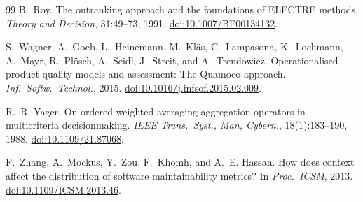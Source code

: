 \documentclass[11pt]{article}
\theoremstyle{remark}
\begin{document}
\begin{thebibliography}{99}
B.~Roy.
\newblock The outranking approach and the foundations of {ELECTRE} methods.
\newblock \emph{Theory and Decision}, 31:49--73, 1991.
\newblock \href{https://doi.org/10.1007/BF00134132}{doi:10.1007/BF00134132}.

S.~Wagner, A.~Goeb, L.~Heinemann, M.~Kl{\"a}s, C.~Lampasona, K.~Lochmann,
  A.~Mayr, R.~Pl{\"o}sch, A.~Seidl, J.~Streit, and A.~Trendowicz.
\newblock Operationalised product quality models and assessment: The
  {Quamoco} approach.
\newblock \emph{Inf.\ Softw.\ Technol.}, 2015.
\newblock \href{https://doi.org/10.1016/j.infsof.2015.02.009}{doi:10.1016/j.infsof.2015.02.009}.

R.~R. Yager.
\newblock On ordered weighted averaging aggregation operators in multicriteria
  decisionmaking.
\newblock \emph{IEEE Trans.\ Syst., Man, Cybern.}, 18(1):183--190, 1988.
\newblock \href{https://doi.org/10.1109/21.87068}{doi:10.1109/21.87068}.

F.~Zhang, A.~Mockus, Y.~Zou, F.~Khomh, and A.~E. Hassan.
\newblock How does context affect the distribution of software maintainability
  metrics?
\newblock In \emph{Proc.\ ICSM}, 2013.
\newblock \href{https://doi.org/10.1109/ICSM.2013.46}{doi:10.1109/ICSM.2013.46}.

\end{thebibliography}
\end{document}
